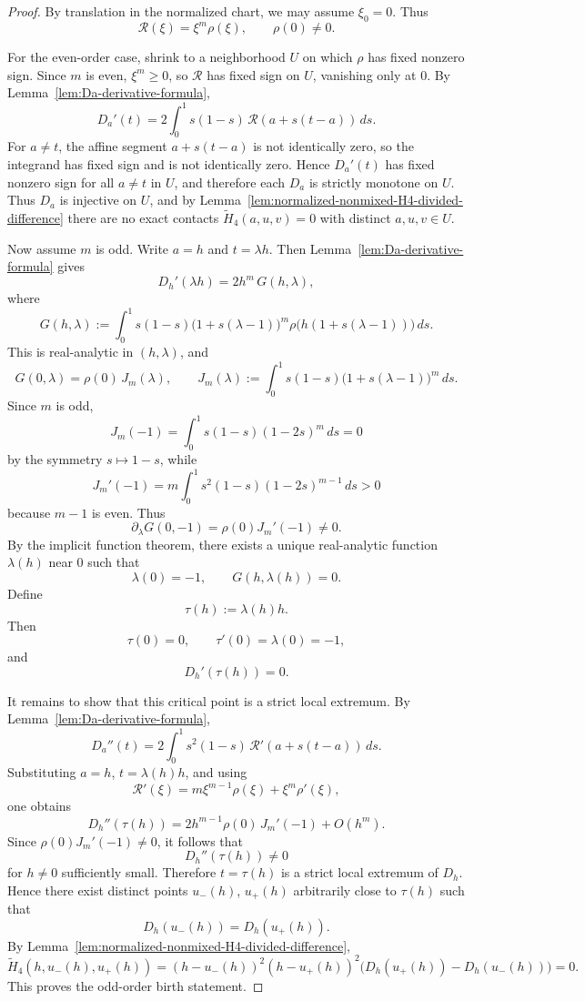 \documentclass[11pt,a4paper]{amsart}
\theoremstyle{plain}
\theoremstyle{definition}
\begin{document}
\begin{proof}
By translation in the normalized chart, we may assume $\xi_0=0$. Thus
\[
\mathcal R(\xi)=\xi^m\rho(\xi),
\qquad
\rho(0)\neq 0.
\]

For the even-order case, shrink to a neighborhood $U$ on which $\rho$ has
fixed nonzero sign. Since $m$ is even, $\xi^m\ge 0$, so $\mathcal R$ has
fixed sign on $U$, vanishing only at $0$. By
Lemma~\ref{lem:Da-derivative-formula},
\[
D_a'(t)=2\int_0^1 s(1-s)\,\mathcal R(a+s(t-a))\,ds.
\]
For $a\neq t$, the affine segment $a+s(t-a)$ is not identically zero, so the
integrand has fixed sign and is not identically zero. Hence $D_a'(t)$ has
fixed nonzero sign for all $a\neq t$ in $U$, and therefore each $D_a$ is
strictly monotone on $U$. Thus $D_a$ is injective on $U$, and by
Lemma~\ref{lem:normalized-nonmixed-H4-divided-difference} there are no exact
contacts $\widetilde H_4(a,u,v)=0$ with distinct $a,u,v\in U$.

Now assume $m$ is odd. Write $a=h$ and $t=\lambda h$. Then
Lemma~\ref{lem:Da-derivative-formula} gives
\[
D_h'(\lambda h)
=
2h^m\,G(h,\lambda),
\]
where
\[
G(h,\lambda)
:=
\int_0^1 s(1-s)\bigl(1+s(\lambda-1)\bigr)^m
\rho\!\bigl(h(1+s(\lambda-1))\bigr)\,ds.
\]
This is real-analytic in $(h,\lambda)$, and
\[
G(0,\lambda)=\rho(0)\,J_m(\lambda),
\qquad
J_m(\lambda):=\int_0^1 s(1-s)\bigl(1+s(\lambda-1)\bigr)^m\,ds.
\]
Since $m$ is odd,
\[
J_m(-1)=\int_0^1 s(1-s)(1-2s)^m\,ds=0
\]
by the symmetry $s\mapsto 1-s$, while
\[
J_m'(-1)
=
m\int_0^1 s^2(1-s)(1-2s)^{m-1}\,ds>0
\]
because $m-1$ is even. Thus
\[
\partial_\lambda G(0,-1)=\rho(0)J_m'(-1)\neq 0.
\]
By the implicit function theorem, there exists a unique real-analytic function
$\lambda(h)$ near $0$ such that
\[
\lambda(0)=-1,
\qquad
G(h,\lambda(h))=0.
\]
Define
\[
\tau(h):=\lambda(h)h.
\]
Then
\[
\tau(0)=0,
\qquad
\tau'(0)=\lambda(0)=-1,
\]
and
\[
D_h'(\tau(h))=0.
\]

It remains to show that this critical point is a strict local extremum. By
Lemma~\ref{lem:Da-derivative-formula},
\[
D_a''(t)=2\int_0^1 s^2(1-s)\,\mathcal R'(a+s(t-a))\,ds.
\]
Substituting $a=h$, $t=\lambda(h)h$, and using
\[
\mathcal R'(\xi)=m\xi^{m-1}\rho(\xi)+\xi^m\rho'(\xi),
\]
one obtains
\[
D_h''(\tau(h))
=
2h^{m-1}\rho(0)\,J_m'(-1)+O(h^m).
\]
Since $\rho(0)J_m'(-1)\neq 0$, it follows that
\[
D_h''(\tau(h))\neq 0
\]
for $h\neq 0$ sufficiently small. Therefore $t=\tau(h)$ is a strict local
extremum of $D_h$. Hence there exist distinct points $u_-(h)$, $u_+(h)$
arbitrarily close to $\tau(h)$ such that
\[
D_h(u_-(h))=D_h(u_+(h)).
\]
By Lemma~\ref{lem:normalized-nonmixed-H4-divided-difference},
\[
\widetilde H_4(h,u_-(h),u_+(h))
=
(h-u_-(h))^2(h-u_+(h))^2
\bigl(D_h(u_+(h))-D_h(u_-(h))\bigr)=0.
\]
This proves the odd-order birth statement.
\end{proof}
\end{document}
